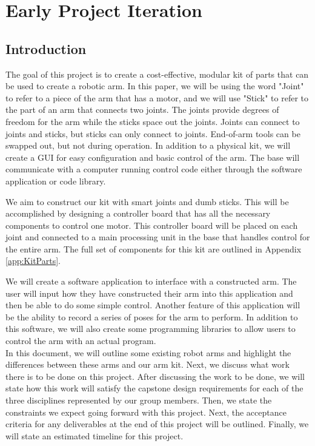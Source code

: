 \section{Early Project Iteration}
\label{app:Early-Project-Iteration}
\subsection{Introduction} 

The goal of this project is to create a cost-effective, modular kit of parts that can be used to create a robotic arm. In this paper, we will be using the word "Joint" to refer to a piece of the arm that has a motor, and we will use "Stick" to refer to the part of an arm that connects two joints. The joints provide degrees of freedom for the arm while the sticks space out the joints. Joints can connect to joints and sticks, but sticks can only connect to joints. End-of-arm tools can be swapped out, but not during operation. In addition to a physical kit, we will create a GUI for easy configuration and basic control of the arm. The base will communicate with a computer running control code either through the software application or code library.

We aim to construct our kit with smart joints and dumb sticks. This will be accomplished by designing a controller board that has all the necessary components to control one motor. This controller board will be placed on each joint and connected to a main processing unit in the base that handles control for the entire arm. The full set of components for this kit are outlined in Appendix \ref{app:KitParts}.

We will create a software application to interface with a constructed arm. The user will input how they have constructed their arm into this application and then be able to do some simple control. Another feature of this application will be the ability to record a series of poses for the arm to perform. In addition to this software, we will also create some programming libraries to allow users to control the arm with an actual program. \\
\newline
In this document, we will outline some existing robot arms and highlight the differences between these arms and our arm kit. Next, we discuss what work there is to be done on this project. After discussing the work to be done, we will state how this work will satisfy the capstone design requirements for each of the three disciplines represented by our group members. Then, we state the constraints we expect going forward with this project. Next, the acceptance criteria for any deliverables at the end of this project will be outlined. Finally, we will state an estimated timeline for this project.

